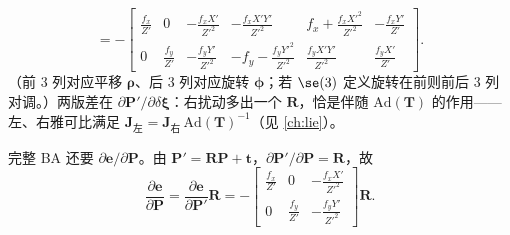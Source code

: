 \begin{derivation}
\begin{equation}
  =-\begin{bmatrix}
  \frac{f_x}{Z'} & 0 & -\frac{f_xX'}{Z'^2} & -\frac{f_xX'Y'}{Z'^2} & f_x+\frac{f_xX'^2}{Z'^2} & -\frac{f_xY'}{Z'}\\[3pt]
  0 & \frac{f_y}{Z'} & -\frac{f_yY'}{Z'^2} & -f_y-\frac{f_yY'^2}{Z'^2} & \frac{f_yX'Y'}{Z'^2} & \frac{f_yX'}{Z'}
  \end{bmatrix}.
  \label{eq:vo-jac-left}
\end{equation}
（前 $3$ 列对应平移 $\boldsymbol{\rho}$、后 $3$ 列对应旋转 $\boldsymbol{\phi}$；若 $\se(3)$ 定义旋转在前则前后 $3$ 列对调。）两版差在 $\partial\mathbf{P}'/\partial\delta\boldsymbol{\xi}$：右扰动多出一个 $\mathbf{R}$，恰是伴随 $\mathrm{Ad}(\mathbf{T})$ 的作用——左、右雅可比满足 $\mathbf{J}_{\text{左}}=\mathbf{J}_{\text{右}}\,\mathrm{Ad}(\mathbf{T})^{-1}$（见 \cref{ch:lie}）。
\end{derivation}

\begin{derivation}
\label{thm:vo-de-dP-world}
完整 BA 还要 $\partial\mathbf{e}/\partial\mathbf{P}$。由 $\mathbf{P}'=\mathbf{R}\mathbf{P}+\mathbf{t}$，$\partial\mathbf{P}'/\partial\mathbf{P}=\mathbf{R}$，故\cite{gaoxiang2019slam14}
\begin{equation}
  \frac{\partial\mathbf{e}}{\partial\mathbf{P}}=\frac{\partial\mathbf{e}}{\partial\mathbf{P}'}\mathbf{R}
  =-\begin{bmatrix}\frac{f_x}{Z'}&0&-\frac{f_xX'}{Z'^2}\\0&\frac{f_y}{Z'}&-\frac{f_yY'}{Z'^2}\end{bmatrix}\mathbf{R}.
  \label{eq:vo-de-dPworld}
\end{equation}
\end{derivation}

